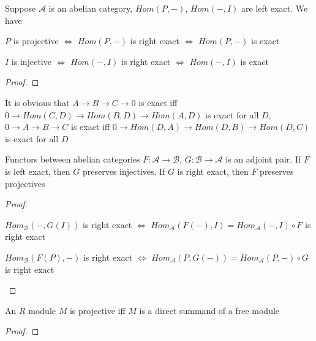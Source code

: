 \documentclass[../main.tex]{subfiles}
\begin{document}
\begin{lemma}
Suppose $\mathscr A$ is an abelian category, $Hom(P,-)$, $Hom(-,I)$ are left exact. We have
\begin{center}
$P$ is projective $\Leftrightarrow$ $Hom(P,-)$ is right exact $\Leftrightarrow$ $Hom(P,-)$ is exact
\end{center}
\begin{center}
$I$ is injective $\Leftrightarrow$ $Hom(-,I)$ is right exact $\Leftrightarrow$ $Hom(-,I)$ is exact
\end{center}
\end{lemma}

\begin{proof}

\end{proof}

\begin{remark}
It is obvious that $A\to B\to C\to0$ is exact iff $0\to Hom(C,D)\to Hom(B,D)\to Hom(A,D)$ is exact for all $D$, $0\to A\to B\to C$ is exact iff $0\to Hom(D,A)\to Hom(D,B)\to Hom(D,C)$ is exact for all $D$
\end{remark}

\begin{lemma}\label{Left adjoint to exact functor preserves projectives}
Functors between abelian categories $F:\mathcal A\to\mathcal B$, $G:\mathcal B\to\mathcal A$ is an adjoint pair. If $F$ is left exact, then $G$ preserves injectives. If $G$ is right exact, then $F$ preserves projectives
\end{lemma}

\begin{proof} \hfill
\begin{center}
$Hom_{\mathcal B}(-,G(I))$ is right exact $\Leftrightarrow$ $Hom_{\mathcal A}(F(-),I)=Hom_{\mathcal A}(-,I)\circ F$ is right exact
\end{center}
\begin{center}
$Hom_{\mathcal B}(F(P),-)$ is right exact $\Leftrightarrow$ $Hom_{\mathcal A}(P,G(-))=Hom_{\mathcal A}(P,-)\circ G$ is right exact
\end{center}
\end{proof}

\begin{lemma}
An $R$ module $M$ is projective iff $M$ is a direct summand of a free module
\end{lemma}

\begin{proof}

\end{proof}
\end{document}
